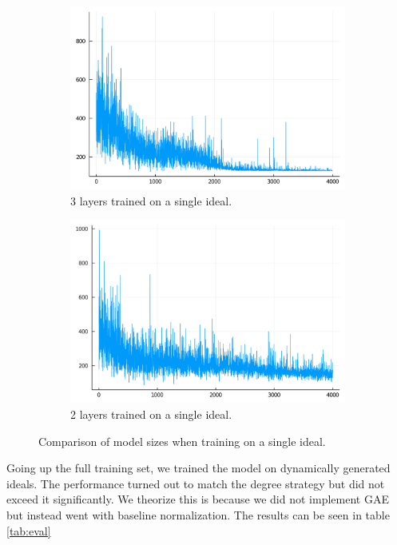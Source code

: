 \documentclass{article}
\theoremstyle{changedot}
\theoremstyle{changedotbreak}
\theoremstyle{nonumberplain}
\begin{document}
\begin{figure}
  \centering
  \begin{subfigure}[b]{0.49\textwidth}
    \centering
    \includegraphics[width=\textwidth]{rews_En3_4k_3layer.png}
    \caption{3 layers trained on a single ideal.}
  \end{subfigure}
  \hfill
  \begin{subfigure}[b]{0.49\textwidth}
    \centering
    \includegraphics[width=\textwidth]{rews_En3_4k_2layer.png}
    \caption{2 layers trained on a single ideal.}
  \end{subfigure}
  \caption{Comparison of model sizes when training on a single ideal.}
  \label{fig:single_ideal}
\end{figure}


Going up the full training set, we trained the model on dynamically generated ideals.  The performance turned out to match the degree strategy but did not exceed it significantly. We theorize this is because we did not implement GAE but instead went with baseline normalization. The results can be seen in table \ref{tab:eval}
\end{document}
